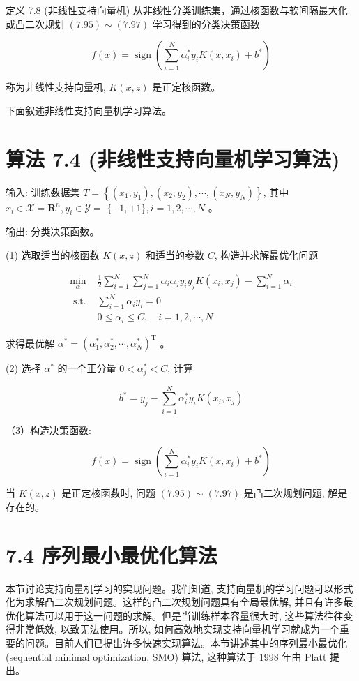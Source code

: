 \documentclass[10pt]{article}
\begin{document}
定义 7.8 (非线性支持向量机) 从非线性分类训练集，通过核函数与软间隔最大化或凸二次规划 $(7.95) \sim(7.97)$ 学习得到的分类决策函数


\begin{equation*}
f(x)=\operatorname{sign}\left(\sum_{i=1}^{N} \alpha_{i}^{*} y_{i} K\left(x, x_{i}\right)+b^{*}\right) \tag{7.94}
\end{equation*}


称为非线性支持向量机, $K(x, z)$ 是正定核函数。

下面叙述非线性支持向量机学习算法。

\section*{算法 7.4 (非线性支持向量机学习算法)}
输入: 训练数据集 $T=\left\{\left(x_{1}, y_{1}\right),\left(x_{2}, y_{2}\right), \cdots,\left(x_{N}, y_{N}\right)\right\}$, 其中 $x_{i} \in \mathcal{X}=\boldsymbol{R}^{n}, y_{i} \in \mathcal{Y}=$ $\{-1,+1\}, i=1,2, \cdots, N$ 。

输出: 分类决策函数。

(1) 选取适当的核函数 $K(x, z)$ 和适当的参数 $C$, 构造并求解最优化问题

\[
\begin{array}{ll}
\min _{\alpha} & \frac{1}{2} \sum_{i=1}^{N} \sum_{j=1}^{N} \alpha_{i} \alpha_{j} y_{i} y_{j} K\left(x_{i}, x_{j}\right)-\sum_{i=1}^{N} \alpha_{i} \\
\text { s.t. } & \sum_{i=1}^{N} \alpha_{i} y_{i}=0 \\
& 0 \leqslant \alpha_{i} \leqslant C, \quad i=1,2, \cdots, N \tag{7.97}
\end{array}
\]

求得最优解 $\alpha^{*}=\left(\alpha_{1}^{*}, \alpha_{2}^{*}, \cdots, \alpha_{N}^{*}\right)^{\mathrm{T}}$ 。

(2) 选择 $\alpha^{*}$ 的一个正分量 $0<\alpha_{j}^{*}<C$, 计算

$$
b^{*}=y_{j}-\sum_{i=1}^{N} \alpha_{i}^{*} y_{i} K\left(x_{i}, x_{j}\right)
$$

（3）构造决策函数:

$$
f(x)=\operatorname{sign}\left(\sum_{i=1}^{N} \alpha_{i}^{*} y_{i} K\left(x, x_{i}\right)+b^{*}\right)
$$

当 $K(x, z)$ 是正定核函数时, 问题 $(7.95) \sim(7.97)$ 是凸二次规划问题, 解是存在的。

\section*{7.4 序列最小最优化算法}
本节讨论支持向量机学习的实现问题。我们知道, 支持向量机的学习问题可以形式化为求解凸二次规划问题。这样的凸二次规划问题具有全局最优解, 并且有许多最优化算法可以用于这一问题的求解。但是当训练样本容量很大时, 这些算法往往变得非常低效, 以致无法使用。所以, 如何高效地实现支持向量机学习就成为一个重要的问题。目前人们已提出许多快速实现算法。本节讲述其中的序列最小最优化 (sequential minimal optimization, SMO) 算法, 这种算法于 1998 年由 Platt 提出。
\end{document}
